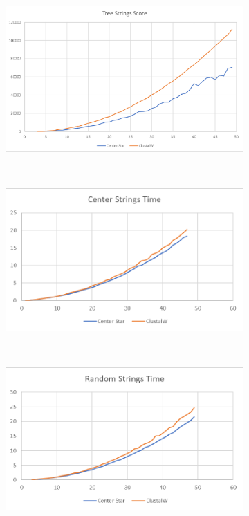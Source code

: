 \documentclass[11pt]{article}
\begin{document}
\begin{figure}
\begin{subfigure}[b]{0.49 \textwidth}
        \caption{}
        \label{fig:randomScore}
    \end{subfigure}
    ~
    \begin{subfigure}[b]{0.49 \textwidth}
        \centering
        \includegraphics[width=\textwidth]{image013.png}
        \caption{}
        \label{fig:treeScore}
    \end{subfigure}
    ~
    \begin{subfigure}[b]{0.49 \textwidth}
        \centering
        \includegraphics[width=\textwidth]{image002.png}
        \caption{}
        \label{fig:centerTime}
    \end{subfigure}
    ~
    \begin{subfigure}[b]{0.49 \textwidth}
        \centering
        \includegraphics[width=\textwidth]{image004.png}

\end{subfigure}
\end{figure}
\end{document}

